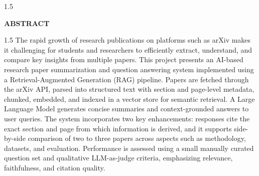 \begin{spacing}{1.5}
\end{spacing}
\vspace{4cm}
\begin{center}
\textbf{{\huge ABSTRACT}}
\end{center}
\vspace{2cm}
\begin{spacing}{1.5}
The rapid growth of research publications on platforms such as arXiv makes it challenging for students and researchers to efficiently extract, understand, and compare key insights from multiple papers. This project presents an AI-based research paper summarization and question answering system implemented using a Retrieval-Augmented Generation (RAG) pipeline. Papers are fetched through the arXiv API, parsed into structured text with section and page-level metadata, chunked, embedded, and indexed in a vector store for semantic retrieval. A Large Language Model generates concise summaries and context-grounded answers to user queries. The system incorporates two key enhancements: responses cite the exact section and page from which information is derived, and it supports side-by-side comparison of two to three papers across aspects such as methodology, datasets, and evaluation. Performance is assessed using a small manually curated question set and qualitative LLM-as-judge criteria, emphasizing relevance, faithfulness, and citation quality.
\end{spacing}
